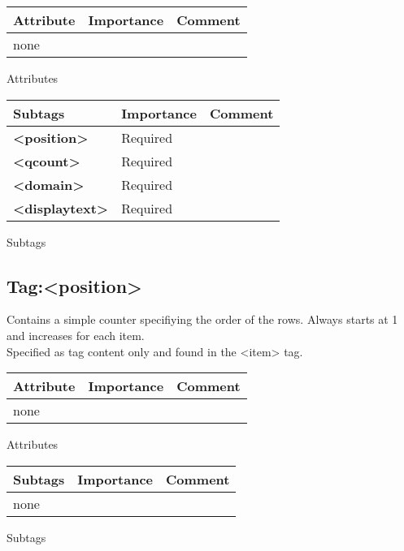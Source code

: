 \documentclass[a4paper]{article}
\newcommand{\xmlv}[1]{\textbf{\textless#1\textgreater}}
\newcommand{\xml}[1]{\textless#1\textgreater}
\begin{document}
    \begin{center}
        \begin{tabular}{ | p{2.1cm} | p{2cm} | p{9cm} |}
        \hline
        \textbf{Attribute} & \textbf{Importance} & \textbf{Comment}  
        \\ \hline
        none & &
        \\ \hline
        \end{tabular}
        
        \small Attributes
        
        \begin{tabular}{ | p{2.1cm} | p{2cm} | p{9cm} |}
        \hline
        \textbf{Subtags} & \textbf{Importance} & \textbf{Comment}  
        \\ \hline
        \xmlv{position}
        &
        Required
        &
        \\ \hline
        \xmlv{qcount}
        &
        Required
        &
        \\ \hline
        \xmlv{domain}
        &
        Required
        &
        
        \\ \hline
        \xmlv{displaytext}
        &
        Required
        &
        
        \\ \hline
        \end{tabular}
        
        \small Subtags
    \end{center}        
    
    \subsection{Tag:\xml{position}  }
        Contains a simple counter specifiying the order of the rows. Always starts at 1 and increases for each item.\\ 
        Specified as tag content only and found in the \xml{item} tag.

    \begin{center}
        \begin{tabular}{ | p{2.1cm} | p{2cm} | p{9cm} |}
        \hline
        \textbf{Attribute} & \textbf{Importance} & \textbf{Comment}  
        \\ \hline
        none & &
        \\ \hline
        \end{tabular}
        
        \small Attributes
        
        \begin{tabular}{ | p{2.1cm} | p{2cm} | p{9cm} |}
        \hline
        \textbf{Subtags} & \textbf{Importance} & \textbf{Comment}  
        \\ \hline
        none
        &
        &
        \\ \hline
        \end{tabular}
        
        \small Subtags
    \end{center} 
    
\end{document}

